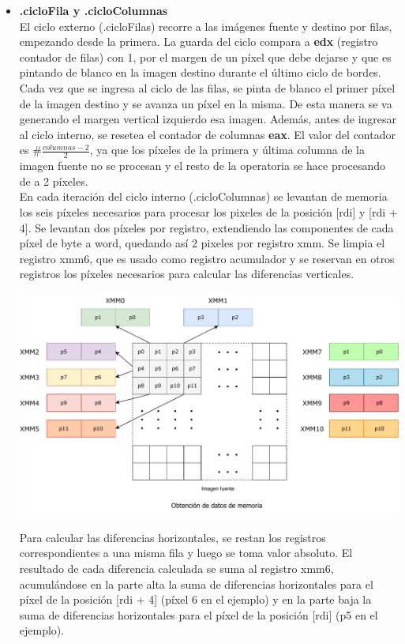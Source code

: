 \documentclass[a4paper]{article}
\begin{document}
\begin{itemize}
	\item \textbf{.cicloFila y .cicloColumnas}\\
	El ciclo externo (.cicloFilas) recorre a las imágenes fuente y destino por filas, empezando desde la primera. La guarda del ciclo compara a \textbf{edx} (registro contador de filas) con 1, por el margen de un píxel que debe dejarse y que es pintando de blanco en la imagen destino durante el último ciclo de bordes. Cada vez que se ingresa al ciclo de las filas, se pinta de blanco el primer píxel de la imagen destino y se avanza un píxel en la misma. De esta manera se va generando el margen vertical izquierdo esa imagen. Además, antes de ingresar al ciclo interno, se resetea el contador de columnas \textbf{eax}. El valor del contador es $\#\frac{columnas-2}{2}$, ya que los píxeles de la primera y última columna de la imagen fuente no se procesan y 
	el resto de la operatoria se hace procesando de a 2 píxeles.\\
	En cada iteración del ciclo interno (.cicloColumnas) se levantan de memoria los seis píxeles necesarios para procesar los pixeles de la posición [rdi] y [rdi + 4]. Se levantan dos píxeles por registro, extendiendo las componentes de cada píxel de byte a word, quedando así 2 pixeles por registro xmm. Se limpia el registro xmm6, que es usado como registro acumulador y se reservan en otros registros los píxeles necesarios para calcular las diferencias verticales.
	\begin{center}
		\includegraphics[scale=0.6]{img/LevColorBordes.pdf}
	\end{center}
	
	Para calcular las diferencias horizontales, se restan los registros correspondientes a una misma fila y luego se toma valor absoluto. El resultado de cada diferencia calculada se suma al registro xmm6, acumulándose en la parte alta la suma de diferencias horizontales para el píxel de la posición [rdi + 4] (píxel 6 en el ejemplo) y en la parte baja la suma de diferencias horizontales para el píxel de la posición [rdi] (p5 en el ejemplo).
	

\end{itemize}
\end{document}
